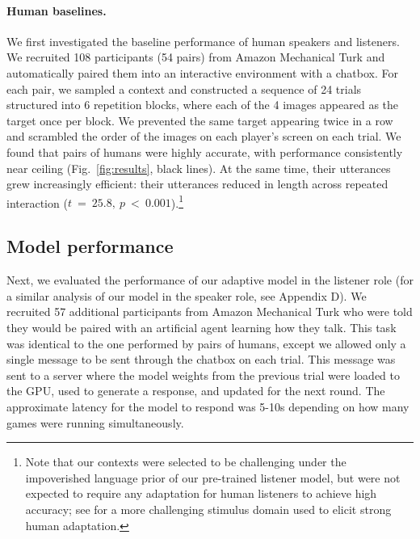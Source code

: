 \documentclass[11pt,a4paper]{article}
\begin{document}
\paragraph{Human baselines.}
We first investigated the baseline performance of human speakers and listeners. %
We recruited 108 participants (54 pairs) from Amazon Mechanical Turk and automatically paired them into an interactive environment with a chatbox.
For each pair, we sampled a context and constructed a sequence of 24 trials structured into 6 repetition blocks, where each of the 4 images appeared as the target once per block. 
We prevented the same target appearing twice in a row and scrambled the order of the images on each player's screen on each trial. 
We found that pairs of humans were highly accurate, with performance consistently near ceiling (Fig.\ \ref{fig:results}, black lines).
At the same time, their utterances grew increasingly efficient: their utterances reduced in length across repeated interaction ($t~=~25.8,~p~<~0.001$).\footnote{Note that our contexts were selected to be challenging under the impoverished language prior of our pre-trained listener model, but were not expected to require any adaptation for human listeners to achieve high accuracy; see \citet{hawkins2019characterizing} for a more challenging stimulus domain used to elicit strong human adaptation.}

\subsection{Model performance}
\label{sec:listening_task}
Next, we evaluated the performance of our adaptive model in the listener role (for a similar analysis of our model in the speaker role, see Appendix D).
We recruited 57 additional participants from Amazon Mechanical Turk who were told they would be paired with an artificial agent learning how they talk.
This task was identical to the one performed by pairs of humans, except we allowed only a single message to be sent through the chatbox on each trial. 
This message was sent to a server where the model weights from the previous trial were loaded to the GPU, used to generate a response, and updated for the next round.
The approximate latency for the model to respond was 5-10s depending on how many games were running simultaneously.
\end{document}
